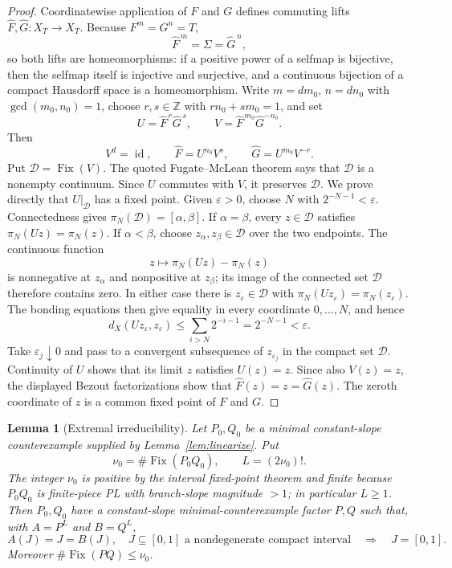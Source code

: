 \documentclass[11pt]{article}
\newtheorem{lemma}[theorem]{Lemma}
\newcommand{\I}{[0,1]}
\newcommand{\Fix}{\operatorname{Fix}}
\newcommand{\id}{\operatorname{id}}
\begin{document}
\begin{proof}
Coordinatewise application of $F$ and $G$ defines commuting lifts $\widehat F,\widehat G:X_T\to X_T$.
Because $F^m=G^n=T$,
\[
\widehat F^{\,m}=\Sigma=\widehat G^{\,n},
\]
so both lifts are homeomorphisms: if a positive power of a selfmap is bijective, then the selfmap itself
is injective and surjective, and a continuous bijection of a compact Hausdorff space is a homeomorphism.
Write $m=dm_0$, $n=dn_0$ with
$\gcd(m_0,n_0)=1$, choose $r,s\in\mathbb Z$ with $rn_0+sm_0=1$, and set
\[
U=\widehat F^{\,r}\widehat G^{\,s},\qquad
V=\widehat F^{\,m_0}\widehat G^{-n_0}.
\]
Then
\[
V^d=\id,\qquad
\widehat F=U^{n_0}V^s,\qquad
\widehat G=U^{m_0}V^{-r}.
\]
Put $\mathcal D=\Fix(V)$. The quoted Fugate--McLean
theorem says that $\mathcal D$ is a nonempty continuum. Since $U$ commutes with $V$, it preserves
$\mathcal D$.
We prove directly that $U|_{\mathcal D}$ has a fixed point. Given $\varepsilon>0$, choose $N$ with
$2^{-N-1}<\varepsilon$. Connectedness gives
$\pi_N(\mathcal D)=[\alpha,\beta]$. If $\alpha=\beta$, every $z\in\mathcal D$ satisfies
$\pi_N(Uz)=\pi_N(z)$. If $\alpha<\beta$, choose $z_\alpha,z_\beta\in\mathcal D$ over the two
endpoints. The continuous function
\[
z\longmapsto \pi_N(Uz)-\pi_N(z)
\]
is nonnegative at $z_\alpha$ and nonpositive at $z_\beta$; its image of the connected set
$\mathcal D$ therefore contains zero. In either case there is $z_\varepsilon\in\mathcal D$ with
$\pi_N(Uz_\varepsilon)=\pi_N(z_\varepsilon)$. The bonding equations then give equality in every
coordinate $0,\ldots,N$, and hence
\[
d_X(Uz_\varepsilon,z_\varepsilon)\leq
\sum_{i>N}2^{-i-1}=2^{-N-1}<\varepsilon.
\]
Take $\varepsilon_j\downarrow0$ and pass to a convergent subsequence of $z_{\varepsilon_j}$ in the
compact set $\mathcal D$. Continuity of $U$ shows that its limit $z$ satisfies $U(z)=z$. Since also
$V(z)=z$, the displayed Bezout factorizations show that
$\widehat F(z)=z=\widehat G(z)$. The zeroth coordinate of $z$ is a common fixed point of $F$ and
$G$.
\end{proof}

\begin{lemma}[Extremal irreducibility]\label{lem:irreducible}
Let $P_0,Q_0$ be a minimal constant-slope counterexample supplied by Lemma~\ref{lem:linearize}. Put
\[
\nu_0=\#\Fix(P_0Q_0),\qquad L=(2\nu_0)!.
\]
The integer $\nu_0$ is positive by the interval fixed-point theorem and finite because $P_0Q_0$ is finite-piece PL with branch-slope magnitude $>1$; in particular $L\geq1$.
Then $P_0,Q_0$ have a constant-slope minimal-counterexample factor $P,Q$ such that, with
$A=P^L$ and $B=Q^L$,
\begin{equation}\label{eq:irreducible}
A(J)=J=B(J),\quad J\subseteq\I\text{ a nondegenerate compact interval}
\quad\Longrightarrow\quad J=\I.
\end{equation}
Moreover $\#\Fix(PQ)\le\nu_0$.
\end{lemma}
\end{document}
